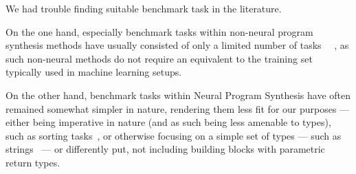 \documentclass{article}
\begin{document}

We had trouble finding suitable benchmark task in the literature.

On the one hand, especially benchmark tasks within non-neural program synthesis methods have usually consisted of only a limited number of tasks%
~\citep{myth,lambda2,typedmil,houdini,tamandu,dilp}~\cite{terpret},
as such non-neural methods do not require an equivalent to the training set typically used in machine learning setups.

On the other hand, benchmark tasks within Neural Program Synthesis have often remained somewhat simpler in nature,
rendering them less fit for our purposes --- either being imperative in nature (and as such being less amenable to types),
such as sorting tasks~\citep{npi,alphanpi},
or otherwise focusing on a simple set of types --- such as strings~\citep{nsps} ---%
or differently put, not including building blocks with parametric return types.
\end{document}
